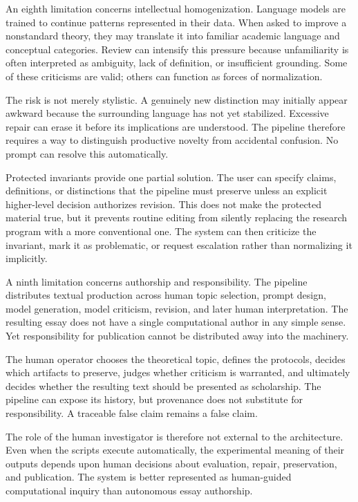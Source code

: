 \documentclass[11pt]{article}
\begin{document}
An eighth limitation concerns intellectual homogenization. Language models are trained to continue patterns represented in their data. When asked to improve a nonstandard theory, they may translate it into familiar academic language and conceptual categories. Review can intensify this pressure because unfamiliarity is often interpreted as ambiguity, lack of definition, or insufficient grounding. Some of these criticisms are valid; others can function as forces of normalization.

The risk is not merely stylistic. A genuinely new distinction may initially appear awkward because the surrounding language has not yet stabilized. Excessive repair can erase it before its implications are understood. The pipeline therefore requires a way to distinguish productive novelty from accidental confusion. No prompt can resolve this automatically.

Protected invariants provide one partial solution. The user can specify claims, definitions, or distinctions that the pipeline must preserve unless an explicit higher-level decision authorizes revision. This does not make the protected material true, but it prevents routine editing from silently replacing the research program with a more conventional one. The system can then criticize the invariant, mark it as problematic, or request escalation rather than normalizing it implicitly.

A ninth limitation concerns authorship and responsibility. The pipeline distributes textual production across human topic selection, prompt design, model generation, model criticism, revision, and later human interpretation. The resulting essay does not have a single computational author in any simple sense. Yet responsibility for publication cannot be distributed away into the machinery.

The human operator chooses the theoretical topic, defines the protocols, decides which artifacts to preserve, judges whether criticism is warranted, and ultimately decides whether the resulting text should be presented as scholarship. The pipeline can expose its history, but provenance does not substitute for responsibility. A traceable false claim remains a false claim.

The role of the human investigator is therefore not external to the architecture. Even when the scripts execute automatically, the experimental meaning of their outputs depends upon human decisions about evaluation, repair, preservation, and publication. The system is better represented as human-guided computational inquiry than autonomous essay authorship.
\end{document}
